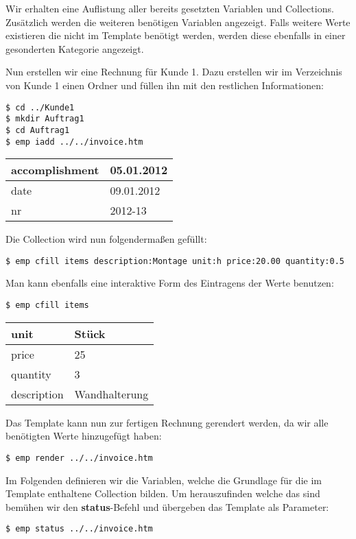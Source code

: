 Wir erhalten eine Auflistung aller bereits gesetzten Variablen und Collections. Zusätzlich werden die weiteren benötigen Variablen angezeigt. Falls weitere Werte existieren die nicht im Template benötigt werden, werden diese ebenfalls in einer gesonderten Kategorie angezeigt.

Nun erstellen wir eine Rechnung für Kunde 1. Dazu erstellen wir im Verzeichnis von Kunde 1 einen Ordner und füllen ihn mit den restlichen Informationen:

\begin{lstlisting}[style=Bash]
$ cd ../Kunde1
$ mkdir Auftrag1
$ cd Auftrag1
$ emp iadd ../../invoice.htm
\end{lstlisting}

\begin{tabular}{| l | l |}
	\hline
	accomplishment & 05.01.2012 \\
	\hline
	date & 09.01.2012 \\
	\hline
	nr & 2012-13 \\
	\hline
\end{tabular}

Die Collection wird nun folgendermaßen gefüllt:
\begin{lstlisting}[style=Bash]
$ emp cfill items description:Montage unit:h price:20.00 quantity:0.5
\end{lstlisting}

Man kann ebenfalls eine interaktive Form des Eintragens der Werte benutzen:
\begin{lstlisting}[style=Bash]
$ emp cfill items
\end{lstlisting}

\begin{tabular}{| l | l |}
	\hline
	unit & Stück \\
	\hline
	price & 25 \\
	\hline
	quantity & 3 \\
	\hline
	description & Wandhalterung \\
	\hline
\end{tabular}

Das Template kann nun zur fertigen Rechnung gerendert werden, da wir alle benötigten Werte hinzugefügt haben:
\begin{lstlisting}[style=Bash]
$ emp render ../../invoice.htm
\end{lstlisting}

Im Folgenden definieren wir die Variablen, welche die Grundlage für die im Template enthaltene Collection bilden. Um herauszufinden welche das sind bemühen wir den \textbf{status}-Befehl und übergeben das Template als Parameter:
\begin{lstlisting}[style=Bash]
$ emp status ../../invoice.htm
\end{lstlisting}

